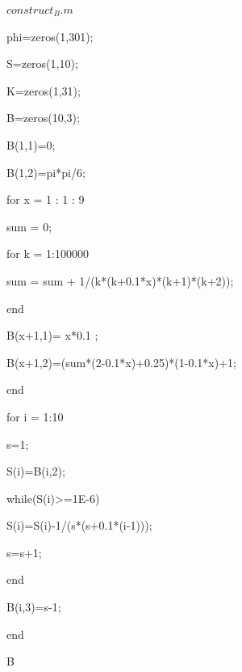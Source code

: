 \documentclass{article}
\begin{document}
$construct_B.m$

phi=zeros(1,301);

S=zeros(1,10);

K=zeros(1,31);

B=zeros(10,3);

B(1,1)=0;

B(1,2)=pi*pi/6;

for x = 1 : 1 : 9

sum = 0;

for k = 1:100000

sum = sum + 1/(k*(k+0.1*x)*(k+1)*(k+2));

end

B(x+1,1)= x*0.1 ;

B(x+1,2)=(sum*(2-0.1*x)+0.25)*(1-0.1*x)+1;

end

for i = 1:10

s=1;

S(i)=B(i,2);

while(S(i)>=1E-6)

S(i)=S(i)-1/(s*(s+0.1*(i-1)));

s=s+1;

end

B(i,3)=s-1;

end

B
	
	
\end{document}
